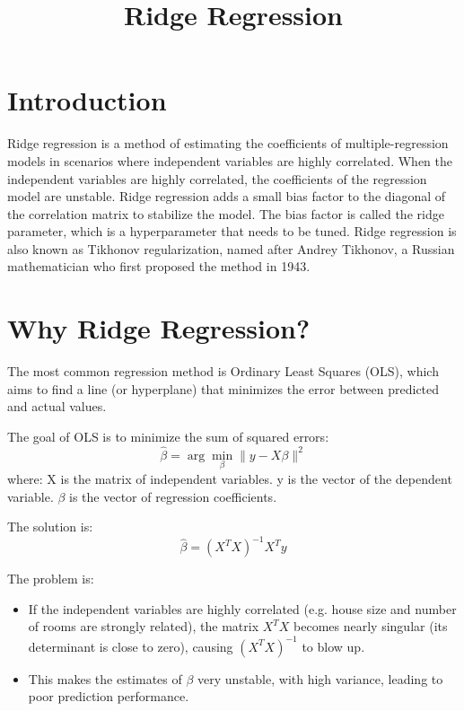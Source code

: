 \documentclass{article}
\begin{document}
\title{Ridge Regression}

\maketitle

\section{Introduction}

Ridge regression is a method of estimating the coefficients 
of multiple-regression models in scenarios where independent 
variables are highly correlated. When the independent variables 
are highly correlated, the coefficients of the regression 
model are unstable. Ridge regression adds a small bias factor 
to the diagonal of the correlation matrix to stabilize the 
model. The bias factor is called the ridge parameter, which 
is a hyperparameter that needs to be tuned. Ridge regression 
is also known as Tikhonov regularization, named after Andrey 
Tikhonov, a Russian mathematician who first proposed the 
method in 1943.

\section{Why Ridge Regression?}

The most common regression method is Ordinary Least 
Squares (OLS), which aims to find a line (or hyperplane) 
that minimizes the error between predicted and actual values.

\smallskip
\noindent
The goal of OLS is to minimize the sum of squared errors:
$$ \hat{\beta} = \arg\min_{\beta} \|y - X\beta\|^2 $$
where:
X is the matrix of independent variables.
y is the vector of the dependent variable.
$\beta{}$ is the vector of regression coefficients.

\smallskip
\noindent
The solution is:
$$ \hat{\beta} = (X^T X)^{-1} X^T y $$

\smallskip
\noindent
The problem is:

\smallskip
\begin{itemize}
	\item If the independent variables are highly correlated 
    (e.g. house size and number of rooms are strongly related), 
	the matrix $X^{T}X$ becomes nearly singular (its determinant 
	is close to zero), causing $(X^{T}X)^{-1}$ to blow up.
	\item This makes the estimates of $\beta$ very unstable, with high variance, leading to poor prediction performance.
\end{itemize}
\end{document}

